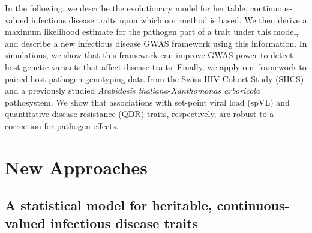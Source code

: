 \documentclass[11pt]{article}
\begin{document}
\begin{linenumbers}

In the following, we describe the evolutionary model for heritable, continuous-valued infectious disease traits upon which our method is based. We then derive a maximum likelihood estimate for the pathogen part of a trait under this model, and describe a new infectious disease GWAS framework using this information. In simulations, we show that this framework can improve GWAS power to detect host genetic variants that affect disease traits. Finally, we apply our framework to paired host-pathogen genotyping data from the Swiss HIV Cohort Study (SHCS) and a previously studied \emph{Arabidosis thaliana}-\emph{Xanthomonas arboricola} pathosystem. We show that associations with set-point viral load (spVL) and quantitative disease resistance (QDR) traits, respectively, are robust to a correction for pathogen effects.

\section*{New Approaches}
\subsection*{A statistical model for heritable, continuous-valued infectious disease traits}


\end{linenumbers}
\end{document}
